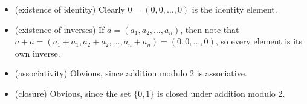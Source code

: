 \documentclass[12pt,reqno]{amsart}
\newcommand{\<}{\ensuremath{\langle}}
\renewcommand{\>}{\ensuremath{\rangle}}
\begin{document}
\begin{enumerate}
\medskip

\begin{itemize}
\item (existence of identity) Clearly $\bar{0} = (0, 0, \dots, 0)$ is the identity element.
\item (existence of inverses) If $\bar{a} = (a_1, a_2, \dots, a_n)$, then note
  that 
  $\bar{a} + \bar{a} = (a_1+a_1, a_2+a_2, \dots, a_n+a_n) = (0, 0, \dots, 0)$, 
  so every element is its own inverse.
\item (associativity) Obvious, since addition modulo 2 is associative.
\item (closure) Obvious, since the set $\{0, 1\}$ is closed under addition modulo 2.
\end{itemize}

\end{enumerate}
\end{document}
